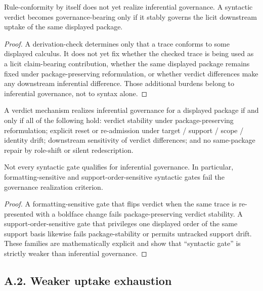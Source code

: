\begin{theorem}
Rule-conformity by itself does not yet realize inferential governance. A syntactic verdict becomes governance-bearing only if it stably governs the licit downstream uptake of the same displayed package.
\end{theorem}

\begin{proof}
A derivation-check determines only that a trace conforms to some displayed calculus. It does not yet fix whether the checked trace is being used as a licit claim-bearing contribution, whether the same displayed package remains fixed under package-preserving reformulation, or whether verdict differences make any downstream inferential difference. Those additional burdens belong to inferential governance, not to syntax alone.
\end{proof}

\begin{theorem}
A verdict mechanism realizes inferential governance for a displayed package if and only if all of the following hold: verdict stability under package-preserving reformulation; explicit reset or re-admission under target / support / scope / identity drift; downstream sensitivity of verdict differences; and no same-package repair by role-shift or silent redescription.
\end{theorem}

\begin{theorem}
Not every syntactic gate qualifies for inferential governance. In particular, formatting-sensitive and support-order-sensitive syntactic gates fail the governance realization criterion.
\end{theorem}

\begin{proof}
A formatting-sensitive gate that flips verdict when the same trace is re-presented with a boldface change fails package-preserving verdict stability. A support-order-sensitive gate that privileges one displayed order of the same support basis likewise fails package-stability or permits untracked support drift. These families are mathematically explicit and show that ``syntactic gate'' is strictly weaker than inferential governance.
\end{proof}

\subsection*{A.2. Weaker uptake exhaustion}

